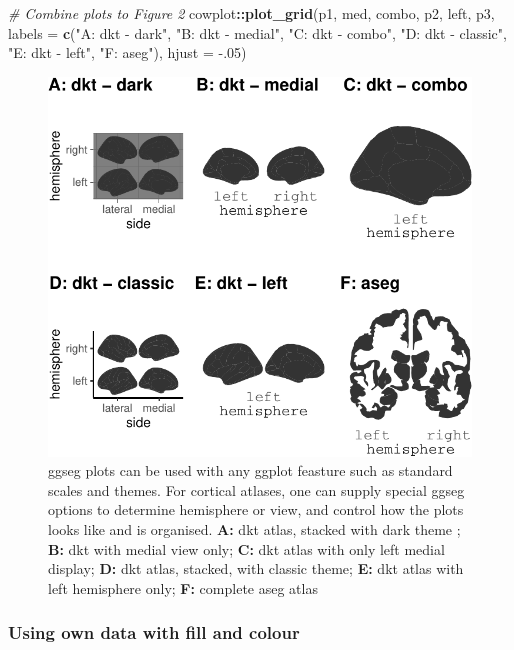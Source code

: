 \documentclass[fleqn,10pt]{wlpeerj} %
\newenvironment{Shaded}{\begin{snugshade}}{\end{snugshade}}
\newcommand{\CommentTok}[1]{\textcolor[rgb]{0.56,0.35,0.01}{\textit{#1}}}
\newcommand{\DataTypeTok}[1]{\textcolor[rgb]{0.13,0.29,0.53}{#1}}
\newcommand{\FloatTok}[1]{\textcolor[rgb]{0.00,0.00,0.81}{#1}}
\newcommand{\KeywordTok}[1]{\textcolor[rgb]{0.13,0.29,0.53}{\textbf{#1}}}
\newcommand{\NormalTok}[1]{#1}
\newcommand{\OperatorTok}[1]{\textcolor[rgb]{0.81,0.36,0.00}{\textbf{#1}}}
\newcommand{\StringTok}[1]{\textcolor[rgb]{0.31,0.60,0.02}{#1}}
\begin{document}
\begin{Shaded}
\begin{Highlighting}[]
\CommentTok{# Combine plots to Figure 2}
\NormalTok{cowplot}\OperatorTok{::}\KeywordTok{plot_grid}\NormalTok{(p1, med, combo,  p2, left, p3,}
                   \DataTypeTok{labels =} \KeywordTok{c}\NormalTok{(}\StringTok{"A: dkt - dark"}\NormalTok{, }\StringTok{"B: dkt - medial"}\NormalTok{,}
                              \StringTok{"C: dkt - combo"}\NormalTok{, }\StringTok{"D: dkt - classic"}\NormalTok{,}
                              \StringTok{"E: dkt - left"}\NormalTok{, }\StringTok{"F: aseg"}\NormalTok{),}
                   \DataTypeTok{hjust =} \FloatTok{-.05}\NormalTok{)}
\end{Highlighting}
\end{Shaded}

\begin{figure}
\centering
\includegraphics{draft_2_files/figure-latex/collection-1.pdf}
\caption{\label{fig:collection}ggseg plots can be used with any ggplot feasture such as standard scales and themes. For cortical atlases, one can supply special ggseg options to determine hemisphere or view, and control how the plots looks like and is organised. \textbf{A:} dkt atlas, stacked with dark theme ; \textbf{B:} dkt with medial view only; \textbf{C:} dkt atlas with only left medial display; \textbf{D:} dkt atlas, stacked, with classic theme; \textbf{E:} dkt atlas with left hemisphere only; \textbf{F:} complete aseg atlas}
\end{figure}

\hypertarget{using-own-data-with-fill-and-colour}{%
\subsubsection{Using own data with fill and colour}\label{using-own-data-with-fill-and-colour}}
\end{document}

